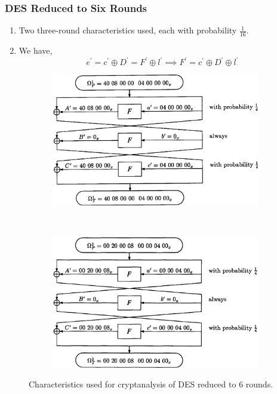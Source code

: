 \documentclass{beamer}
\begin{document}
    \begin{frame}
        \frametitle{DES Reduced to Six Rounds}
        \begin{enumerate}
            \item Two three-round characteristics used, each with probability
            \(\frac{1}{16}\).
            \item<2-> We have,
            \begin{equation}
                e^\prime = c^\prime \oplus D^\prime = F^\prime \oplus l^\prime \implies F^\prime = c^\prime \oplus D^\prime \oplus l^\prime
            \end{equation}
        \end{enumerate}
        \begin{figure}[!ht]
            \centering
            \begin{subfigure}{0.4\linewidth}
                \includegraphics[width=\columnwidth]{images/des_6round_char1.png}
            \end{subfigure}
            ~
            \begin{subfigure}{0.4\linewidth}
                \includegraphics[width=\columnwidth]{images/des_6round_char2.png}
            \end{subfigure}
            \caption{Characteristics used for cryptanalysis of DES reduced to 6 rounds.}
            \label{fig:des-6-char}
        \end{figure}
    \end{frame}
\end{document}
